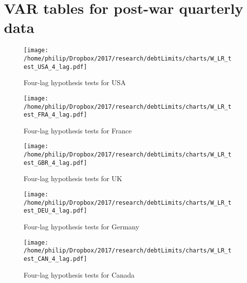 \documentclass{article}
\begin{document}
\section*{VAR tables for post-war quarterly data}

	{\def\arraystretch{1.2}\tabcolsep=2pt
		
		
		
		
		
		
		
		
		
		
		
		
		
		
	}

	\newpage

	\begin{figure}[htbp]
	    \centering
		\texttt{[image: /home/philip/Dropbox/2017/research/debtLimits/charts/W\_LR\_test\_USA\_4\_lag.pdf]}
		\caption{Four-lag hypothesis tests for USA}
	\end{figure}
	
	\begin{figure}[htbp]
	    \centering
		\texttt{[image: /home/philip/Dropbox/2017/research/debtLimits/charts/W\_LR\_test\_FRA\_4\_lag.pdf]}
		\caption{Four-lag hypothesis tests for France}
	\end{figure}
	
	\begin{figure}[htbp]
	    \centering
		\texttt{[image: /home/philip/Dropbox/2017/research/debtLimits/charts/W\_LR\_test\_GBR\_4\_lag.pdf]}
		\caption{Four-lag hypothesis tests for UK}
	\end{figure}

	\begin{figure}[htbp]
	    \centering
		\texttt{[image: /home/philip/Dropbox/2017/research/debtLimits/charts/W\_LR\_test\_DEU\_4\_lag.pdf]}
		\caption{Four-lag hypothesis tests for Germany}
	\end{figure}

	\begin{figure}[htbp]
	    \centering
		\texttt{[image: /home/philip/Dropbox/2017/research/debtLimits/charts/W\_LR\_test\_CAN\_4\_lag.pdf]}
		\caption{Four-lag hypothesis tests for Canada}
	\end{figure}
\end{document}
